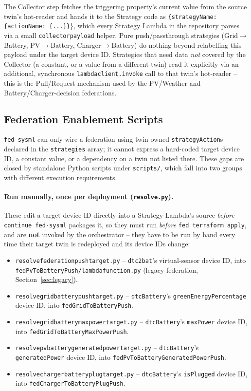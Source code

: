 \documentclass[11pt]{article}
\renewcommand{\_}{\textunderscore\allowbreak}
\begin{document}
The Collector step fetches the triggering property's current value from the
source twin's hot-reader and hands it to the Strategy code as
\texttt{\{strategyName: \{actionName: \{...\}\}}\}, which every Strategy
Lambda in the repository parses via a small \texttt{\_collector\_payload}
helper. Pure push/passthrough strategies (Grid$\rightarrow$Battery,
PV$\rightarrow$Battery, Charger$\rightarrow$Battery) do nothing beyond
relabelling this payload under the target device ID. Strategies that need
data \emph{not} covered by the Collector (a constant, or a value from a
different twin) read it explicitly via an additional, synchronous
\texttt{lambda\_client.invoke} call to that twin's hot-reader -- this is the
Pull/Request mechanism used by the PV/Weather and Battery/Charger-decision
federations.

\subsection{Federation Enablement Scripts}

\texttt{fed-sysml} can only wire a federation using twin-owned
\texttt{strategyAction}s declared in the \texttt{strategies} array; it cannot
express a hard-coded target device ID, a constant value, or a dependency on
a twin not listed there. These gaps are closed by standalone Python scripts
under \texttt{scripts/}, which fall into two groups with different execution
requirements.

\paragraph{Run manually, once per deployment (\texttt{resolve\_*.py}).}
These edit a target device ID directly into a Strategy Lambda's source
\emph{before} \texttt{continue fed-sysml} packages it, so they must run
\emph{before} \texttt{fed terraform apply}, and are \textbf{not} invoked by
the orchestrator -- they have to be run by hand every time their target
twin is redeployed and its device IDs change:
\begin{itemize}[nosep]
  \item \texttt{resolve\_federation\_push\_target.py} -- \texttt{dtc2bat}'s
        virtual-sensor device ID, into
        \texttt{fedPvToBatteryPush/lambda\_function.py} (legacy federation,
        Section~\ref{sec:legacy}).
  \item \texttt{resolve\_grid\_battery\_push\_target.py} -- \texttt{dtcBattery}'s
        \texttt{greenEnergyPercentage} device ID, into
        \texttt{fedGridToBatteryPush}.
  \item \texttt{resolve\_grid\_battery\_maxpower\_target.py} --
        \texttt{dtcBattery}'s \texttt{maxPower} device ID, into
        \texttt{fedGridToBatteryMaxPowerPush}.
  \item \texttt{resolve\_pv\_battery\_generatedpower\_target.py} --
        \texttt{dtcBattery}'s \texttt{generatedPower} device ID, into
        \texttt{fedPvToBatteryGeneratedPowerPush}.
  \item \texttt{resolve\_charger\_battery\_plug\_target.py} --
        \texttt{dtcBattery}'s \texttt{isPlugged} device ID, into
        \texttt{fedChargerToBatteryPlugPush}.
\end{itemize}
\end{document}
